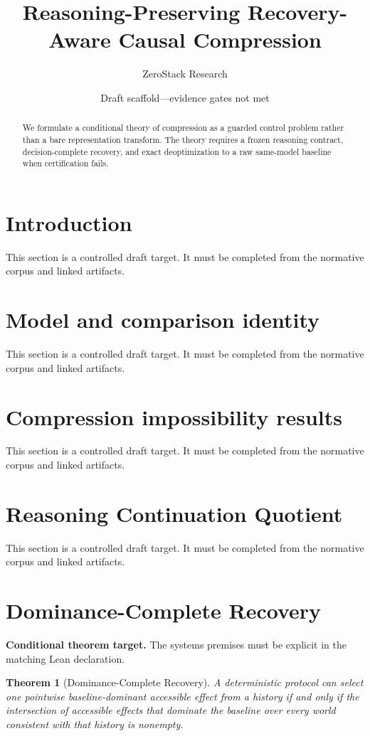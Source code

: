\documentclass[11pt]{article}
\title{Reasoning-Preserving Recovery-Aware Causal Compression}
\author{ZeroStack Research}
\date{Draft scaffold---evidence gates not met}
\newtheorem{theorem}{Theorem}
\begin{document}
\maketitle
\begin{abstract}
We formulate a conditional theory of compression as a guarded control problem rather than a bare representation transform. The theory requires a frozen reasoning contract, decision-complete recovery, and exact deoptimization to a raw same-model baseline when certification fails.
\end{abstract}
\tableofcontents
\section{Introduction}
This section is a controlled draft target. It must be completed from the normative corpus and linked artifacts.

\section{Model and comparison identity}
This section is a controlled draft target. It must be completed from the normative corpus and linked artifacts.

\section{Compression impossibility results}
This section is a controlled draft target. It must be completed from the normative corpus and linked artifacts.

\section{Reasoning Continuation Quotient}
This section is a controlled draft target. It must be completed from the normative corpus and linked artifacts.

\section{Dominance-Complete Recovery}
\textbf{Conditional theorem target.} The systems premises must be explicit in the matching Lean declaration.
\begin{theorem}[Dominance-Complete Recovery]
A deterministic protocol can select one pointwise baseline-dominant accessible effect from a history if and only if the intersection of accessible effects that dominate the baseline over every world consistent with that history is nonempty.
\end{theorem}
\end{document}
